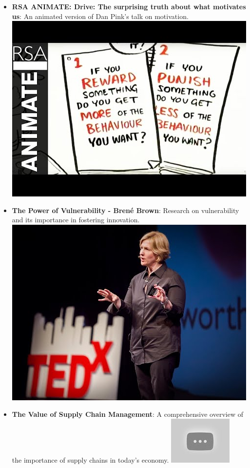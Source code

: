 \documentclass[
  letterpaper,
  DIV=11,
  numbers=noendperiod]{scrreprt}
\begin{document}
\begin{itemize}
\item
  \textbf{RSA ANIMATE: Drive: The surprising truth about what motivates
  us}: An animated version of Dan Pink's talk on motivation.
  \href{https://www.youtube.com/watch?v=u6XAPnuFjJc}{\includegraphics{index_files/mediabag/012.jpg}}
\item
  \textbf{The Power of Vulnerability - Brené Brown}: Research on
  vulnerability and its importance in fostering innovation.
  \href{https://www.youtube.com/watch?v=iCvmsMzlF7o}{\includegraphics{index_files/mediabag/0123.jpg}}
\item
  \textbf{The Value of Supply Chain Management}: A comprehensive
  overview of the importance of supply chains in today's economy.
  \href{https://www.youtube.com/watch?v=9HD3C5vD3lU}{\includegraphics{index_files/mediabag/012345.jpg}}

\end{itemize}
\end{document}
